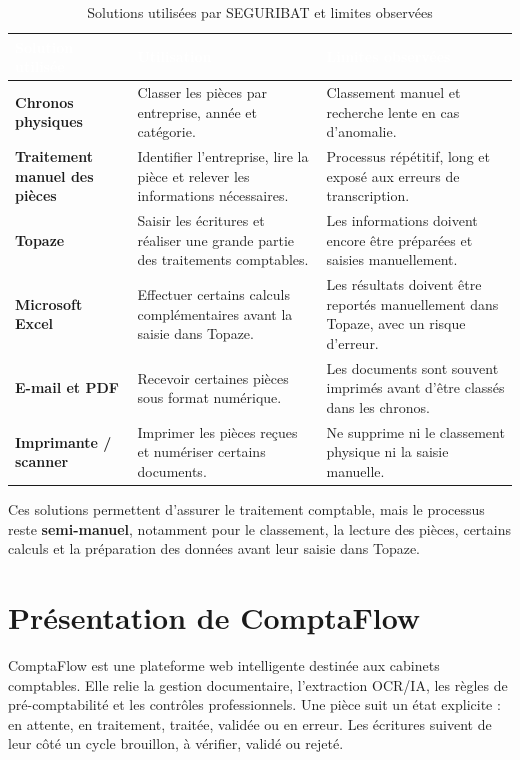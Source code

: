 \documentclass[12pt,a4paper,oneside]{report}
\newcommand{\TableSetup}{%
  \arrayrulecolor{ComptaTableLine}%
  \setlength{\arrayrulewidth}{0.45pt}%
  \renewcommand{\arraystretch}{1.18}%
}
\newcommand{\TableHead}[1]{\textcolor{white}{\textbf{#1}}}
\begin{document}
\begin{table}[H]
\centering
\caption{Solutions utilisées par SEGURIBAT et limites observées}
\label{tab:solutions-existantes-seguribat}
\TableSetup
\begin{tabularx}{\textwidth}{|L{3.3cm}|L{5.1cm}|Y|}
\toprule
{}\TableHead{Solution utilisée} & \TableHead{Utilisation} & \TableHead{Limites observées} \\
\midrule
\textbf{Chronos physiques} & Classer les pièces par entreprise, année et catégorie. & Classement manuel et recherche lente en cas d'anomalie. \\
\textbf{Traitement manuel des pièces} & Identifier l'entreprise, lire la pièce et relever les informations nécessaires. & Processus répétitif, long et exposé aux erreurs de transcription. \\
\textbf{Topaze} & Saisir les écritures et réaliser une grande partie des traitements comptables. & Les informations doivent encore être préparées et saisies manuellement. \\
\textbf{Microsoft Excel} & Effectuer certains calculs complémentaires avant la saisie dans Topaze. & Les résultats doivent être reportés manuellement dans Topaze, avec un risque d'erreur. \\
\textbf{E-mail et PDF} & Recevoir certaines pièces sous format numérique. & Les documents sont souvent imprimés avant d'être classés dans les chronos. \\
\textbf{Imprimante / scanner} & Imprimer les pièces reçues et numériser certains documents. & Ne supprime ni le classement physique ni la saisie manuelle. \\
\bottomrule
\end{tabularx}
\end{table}

Ces solutions permettent d'assurer le traitement comptable, mais le processus reste \textbf{semi-manuel}, notamment pour le classement, la lecture des pièces, certains calculs et la préparation des données avant leur saisie dans Topaze.

\section{Présentation de ComptaFlow}

ComptaFlow est une plateforme web intelligente destinée aux cabinets comptables. Elle relie la gestion documentaire, l'extraction OCR/IA, les règles de pré-comptabilité et les contrôles professionnels. Une pièce suit un état explicite : en attente, en traitement, traitée, validée ou en erreur. Les écritures suivent de leur côté un cycle brouillon, à vérifier, validé ou rejeté.
\end{document}
